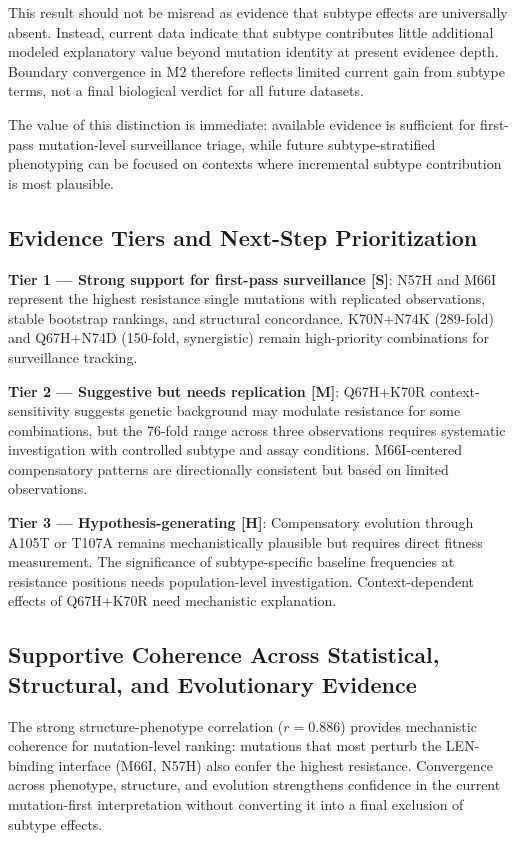 \documentclass[preprint]{elsarticle}
\newcommand{\claimlabel}[1]{\textbf{[#1]}}
\begin{document}
This result should not be misread as evidence that subtype effects are universally absent. Instead, current data indicate that subtype contributes little additional modeled explanatory value beyond mutation identity at present evidence depth. Boundary convergence in M2 therefore reflects limited current gain from subtype terms, not a final biological verdict for all future datasets.

The value of this distinction is immediate: available evidence is sufficient for first-pass mutation-level surveillance triage, while future subtype-stratified phenotyping can be focused on contexts where incremental subtype contribution is most plausible.

\subsection{Evidence Tiers and Next-Step Prioritization}

\textbf{Tier 1 --- Strong support for first-pass surveillance \claimlabel{S}}: N57H and M66I represent the highest resistance single mutations with replicated observations, stable bootstrap rankings, and structural concordance. K70N+N74K (289-fold) and Q67H+N74D (150-fold, synergistic) remain high-priority combinations for surveillance tracking.

\textbf{Tier 2 --- Suggestive but needs replication \claimlabel{M}}: Q67H+K70R context-sensitivity suggests genetic background may modulate resistance for some combinations, but the 76-fold range across three observations requires systematic investigation with controlled subtype and assay conditions. M66I-centered compensatory patterns are directionally consistent but based on limited observations.

\textbf{Tier 3 --- Hypothesis-generating \claimlabel{H}}: Compensatory evolution through A105T or T107A remains mechanistically plausible but requires direct fitness measurement. The significance of subtype-specific baseline frequencies at resistance positions needs population-level investigation. Context-dependent effects of Q67H+K70R need mechanistic explanation.

\subsection{Supportive Coherence Across Statistical, Structural, and Evolutionary Evidence}

The strong structure-phenotype correlation ($r=0.886$) provides mechanistic coherence for mutation-level ranking: mutations that most perturb the LEN-binding interface (M66I, N57H) also confer the highest resistance. Convergence across phenotype, structure, and evolution strengthens confidence in the current mutation-first interpretation without converting it into a final exclusion of subtype effects.
\end{document}
